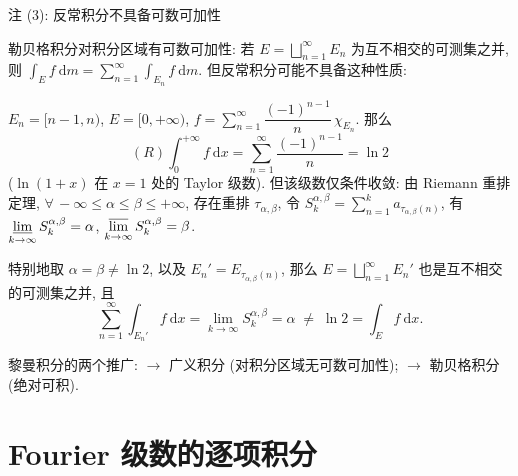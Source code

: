 
\begin{frame}{注 (3): 反常积分不具备可数可加性}

勒贝格积分对积分区域有\alert{可数可加性}: 若 $E = \bigsqcup_{n=1}^{\infty} E_n$
为互不相交的可测集之并, 则 $\int_E f ~ \mathrm{d} m = \sum_{n=1}^{\infty} \int_{E_n} f ~ \mathrm{d} m$.
但\alert{反常积分可能不具备}这种性质:

\pause

\begin{eg}
$E_n = [n-1, n)$, $E = [0, +\infty)$,
$f = \sum_{n=1}^{\infty} \dfrac{(-1)^{n-1}}{n}\, \chi_{E_n}$. 那么
\[
(R) \int_0^{+\infty} f ~ \mathrm{d} x = \sum_{n=1}^{\infty} \frac{(-1)^{n-1}}{n} = \ln 2
\]
($\ln(1+x)$ 在 $x = 1$ 处的 Taylor 级数). 但该级数仅\alert{条件收敛}:
由 Riemann 重排定理, $\forall\, -\infty \leqslant \alpha \leqslant \beta \leqslant +\infty$,
存在重排 $\tau_{\alpha, \beta}$, 令 $S_k^{\alpha, \beta} = \sum_{n=1}^{k} a_{\tau_{\alpha,\beta}(n)}$, 有
$\varliminf\limits_{k \to \infty} S_k^{\alpha,\beta} = \alpha$,
$\varlimsup\limits_{k \to \infty} S_k^{\alpha,\beta} = \beta$.

特别地取 $\alpha = \beta \neq \ln 2$, 以及 $E_n' = E_{\tau_{\alpha,\beta}(n)}$, 那么
$E = \bigsqcup_{n=1}^{\infty} E_n'$ 也是互不相交的可测集之并, 且
\[
\sum_{n=1}^{\infty} \int_{E_n'} f ~ \mathrm{d} x
= \lim_{k \to \infty} S_k^{\alpha, \beta} = \alpha \;\neq\; \ln 2 = \int_E f ~ \mathrm{d} x .
\]
\end{eg}

黎曼积分的两个推广: $\longrightarrow$ 广义积分 (对积分区域无可数可加性);
$\longrightarrow$ 勒贝格积分 (绝对可积).

\end{frame}


\section[Fourier]{Fourier 级数的逐项积分}


